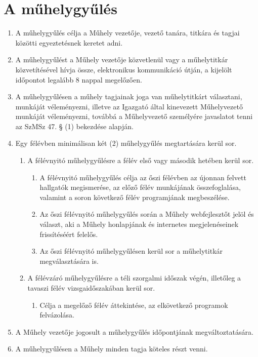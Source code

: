 \documentclass{../styles/rulebook}
\begin{document}
\section{A műhelygyűlés}

\begin{enumerate}
	\item  A műhelygyűlés célja a Műhely vezetője, vezető tanára, titkára és tagjai közötti
	egyeztetésnek keretet adni.
	\item A műhelygyűlést a Műhely vezetője közvetlenül vagy a műhelytitkár közvetítésével
	hívja össze, elektronikus kommunikáció útján, a kijelölt időpontot legalább 8 nappal megelőzően.
	\item A műhelygyűlésen a műhely tagjainak joga van műhelytitkárt választani, munkáját
	véleményezni, illetve az Igazgató által kinevezett Műhelyvezető munkáját véleményezni, továbbá a Műhelyvezető személyére javaslatot tenni az SzMSz
	47. § (1) bekezdése alapján.
	\item Egy félévben minimálisan két (2) műhelygyűlés megtartására kerül sor.
	\begin{enumerate}
		\item A félévnyitó műhelygyűlésre a félév első vagy második hetében kerül sor. 
		\begin{enumerate}
			\item A félévnyitó műhelygyűlés célja
			az őszi félévben az újonnan felvett hallgatók megismerése, az előző félév
			munkájának összefoglalása, valamint a soron következő félév programjának
			megbeszélése.
			\item Az őszi félévnyitó műhelygyűlés során a Műhely webfejlesztőt jelöl és választ,
			aki a Műhely honlapjának és internetes megjelenéseinek frissítéséért felelős.
			\item Az őszi félévnyitó műhelygyűlésen kerül sor a műhelytitkár megválasztására is.
		\end{enumerate}
		\item A félévzáró műhelygyűlésre a téli szorgalmi időszak végén, illetőleg a tavaszi
		félév vizsgaidőszakában kerül sor. 
		\begin{enumerate}
			\item Célja a megelőző félév áttekintése, az
			elkövetkező programok felvázolása.
		\end{enumerate}
	\end{enumerate}
	\item A Műhely vezetője jogosult a műhelygyűlés időpontjának megváltoztatására.
	\item A műhelygyűlésen a Műhely minden tagja köteles részt venni.

\end{enumerate}
\end{document}
